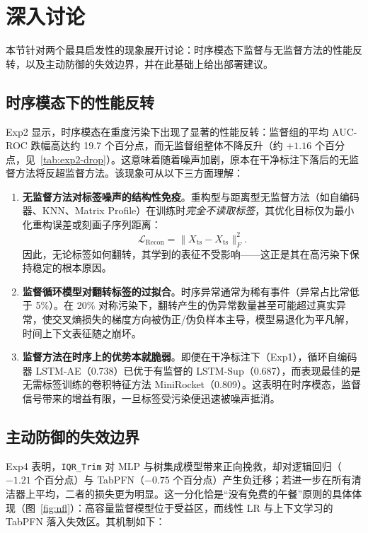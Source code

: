 \chapter{深入讨论}\label{chap:discussion}

本节针对两个最具启发性的现象展开讨论：时序模态下监督与无监督方法的性能反转，以及主动防御的失效边界，并在此基础上给出部署建议。

\section{时序模态下的性能反转}

Exp2 显示，时序模态在重度污染下出现了显著的性能反转：监督组的平均 AUC-ROC 跌幅高达约 19.7 个百分点，而无监督组整体不降反升（约 $+1.16$ 个百分点，见~\ref{tab:exp2-drop}）。这意味着随着噪声加剧，原本在干净标注下落后的无监督方法将反超监督方法。该现象可从以下三方面理解：

\begin{enumerate}
    \item \textbf{无监督方法对标签噪声的结构性免疫}。重构型与距离型无监督方法（如自编码器、KNN、Matrix Profile）在训练时\emph{完全不读取标签}，其优化目标仅为最小化重构误差或刻画子序列距离：
    \begin{equation}
        \mathcal{L}_{\text{Recon}}=\|X_{\text{ts}}-\hat{X}_{\text{ts}}\|_F^2 .
    \end{equation}
    因此，无论标签如何翻转，其学到的表征不受影响——这正是其在高污染下保持稳定的根本原因。
    \item \textbf{监督循环模型对翻转标签的过拟合}。时序异常通常为稀有事件（异常占比常低于 5\%）。在 20\% 对称污染下，翻转产生的伪异常数量甚至可能超过真实异常，使交叉熵损失的梯度方向被伪正/伪负样本主导，模型易退化为平凡解，时间上下文表征随之崩坏。
    \item \textbf{监督方法在时序上的优势本就脆弱}。即便在干净标注下（Exp1），循环自编码器 LSTM-AE（0.738）已优于有监督的 LSTM-Sup（0.687），而表现最佳的是无需标签训练的卷积特征方法 MiniRocket（0.809）。这表明在时序模态，监督信号带来的增益有限，一旦标签受污染便迅速被噪声抵消。
\end{enumerate}

\section{主动防御的失效边界}

Exp4 表明，\texttt{IQR\_Trim} 对 MLP 与树集成模型带来正向挽救，却对逻辑回归（$-1.21$ 个百分点）与 TabPFN（$-0.75$ 个百分点）产生负迁移；若进一步在所有清洁器上平均，二者的损失更为明显。这一分化恰是“没有免费的午餐”原则的具体体现（图~\ref{fig:nfl}）：高容量监督模型位于受益区，而线性 LR 与上下文学习的 TabPFN 落入失效区。其机制如下：

